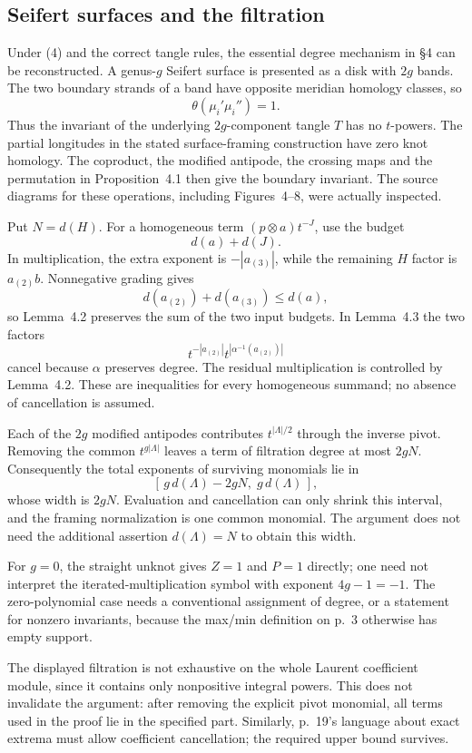 \documentclass[10pt]{article}
\begin{document}
\subsection*{Seifert surfaces and the filtration}
Under (4) and the correct tangle rules, the essential degree mechanism in §4 can be reconstructed. A genus-\(g\) Seifert surface is presented as a disk with \(2g\) bands. The two boundary strands of a band have opposite meridian homology classes, so \[\theta(\mu_i'\mu_i'')=1.\] Thus the invariant of the underlying \(2g\)-component tangle \(T\) has no \(t\)-powers. The partial longitudes in the stated surface-framing construction have zero knot homology. The coproduct, the modified antipode, the crossing maps and the permutation in Proposition 4.1 then give the boundary invariant. The source diagrams for these operations, including Figures 4–8, were actually inspected.\par
Put \(N=d(H)\). For a homogeneous term \((p\otimes a)t^{-J}\), use the budget \[d(a)+d(J).\] In multiplication, the extra exponent is \(-|a_{(3)}|\), while the remaining \(H\) factor is \(a_{(2)}b\). Nonnegative grading gives \[d(a_{(2)})+d(a_{(3)})\le d(a),\] so Lemma 4.2 preserves the sum of the two input budgets. In Lemma 4.3 the two factors \[t^{-|a_{(2)}|}
                  t^{|\alpha^{-1}(a_{(2)})|}\] cancel because \(\alpha\) preserves degree. The residual multiplication is controlled by Lemma 4.2. These are inequalities for every homogeneous summand; no absence of cancellation is assumed.\par
Each of the \(2g\) modified antipodes contributes \(t^{|\Lambda|/2}\) through the inverse pivot. Removing the common \(t^{g|\Lambda|}\) leaves a term of filtration degree at most \(2gN\). Consequently the total exponents of surviving monomials lie in \[[\,g\,d(\Lambda)-2gN,\;g\,d(\Lambda)\,],
                                                               \tag{9}\] whose width is \(2gN\). Evaluation and cancellation can only shrink this interval, and the framing normalization is one common monomial. The argument does not need the additional assertion \(d(\Lambda)=N\) to obtain this width.\par
For \(g=0\), the straight unknot gives \(Z=1\) and \(P=1\) directly; one need not interpret the iterated-multiplication symbol with exponent \(4g-1=-1\). The zero-polynomial case needs a conventional assignment of degree, or a statement for nonzero invariants, because the max/min definition on p. 3 otherwise has empty support.\par
The displayed filtration is not exhaustive on the whole Laurent coefficient module, since it contains only nonpositive integral powers. This does not invalidate the argument: after removing the explicit pivot monomial, all terms used in the proof lie in the specified part. Similarly, p. 19’s language about exact extrema must allow coefficient cancellation; the required upper bound survives.\par
\end{document}
